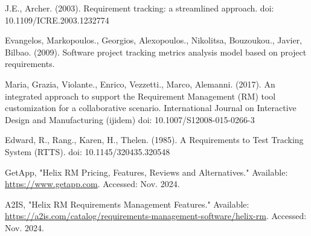 \begin{thebibliography}{00}
    J.E., Archer. (2003).
    Requirement tracking: a streamlined approach.
    doi: 10.1109/ICRE.2003.1232774

    Evangelos, Markopoulos., Georgios, Alexopoulos., Nikolitsa, Bouzoukou., Javier, Bilbao. (2009).
    Software project tracking metrics analysis model based on project requirements.

    Maria, Grazia, Violante., Enrico, Vezzetti., Marco, Alemanni. (2017).
    An integrated approach to support the Requirement Management (RM) tool customization for a collaborative scenario.
    International Journal on Interactive Design and Manufacturing (ijidem)
    doi: 10.1007/S12008-015-0266-3

    Edward, R., Rang., Karen, H., Thelen. (1985).
    A Requirements to Test Tracking System (RTTS).
    doi: 10.1145/320435.320548

    GetApp,
    "Helix RM Pricing, Features, Reviews and Alternatives."
    Available: \url{https://www.getapp.com}.
    Accessed: Nov. 2024.

    A2IS,
    "Helix RM Requirements Management Features."
    Available: \url{https://a2is.com/catalog/requirements-management-software/helix-rm}.
    Accessed: Nov. 2024.

\end{thebibliography}
